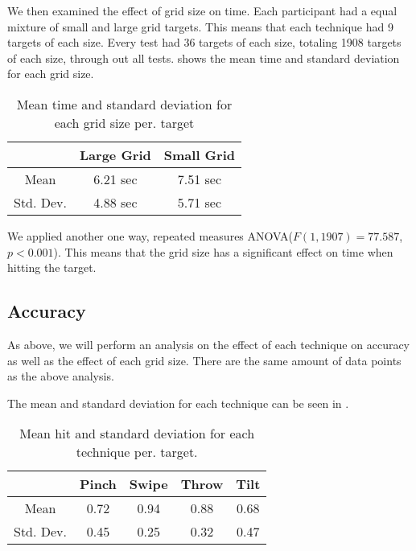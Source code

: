 We then examined the effect of grid size on time. Each participant had a equal mixture of small and large grid targets. This means that each technique had 9 targets of each size. Every test had 36 targets of each size, totaling 1908 targets of each size, through out all tests.  shows the mean time and standard deviation for each grid size. 

\begin{table}[H]
	\centering
	\begin{tabular}{|c|c|c|}
		\hline
		\rowcolor[HTML]{9B9B9B} 
		 & \textbf{Large Grid} & \textbf{Small Grid} \\ \hline
		Mean & 6.21 sec & 7.51 sec \\ \hline
		Std. Dev. & 4.88 sec & 5.71 sec \\ \hline
	\end{tabular}
	\caption{Mean time and standard deviation for each grid size per. target}
	\label{tab:meanTimesSize}
\end{table}

We applied another one way, repeated measures ANOVA($F(1,1907) = 77.587$, $p<0.001$). This means that the grid size has a significant effect on time when hitting the target. 

\subsection{Accuracy}

As above, we will perform an analysis on the effect of each technique on accuracy as well as the effect of each grid size. There are the same amount of data points as the above analysis. 

The mean and standard deviation for each technique can be seen in . 

\begin{table}[H]
	\centering
	\begin{tabular}{|c|c|c|c|c|}
			\hline
			\rowcolor[HTML]{9B9B9B} 
			& \textbf{Pinch} & \textbf{Swipe} & \textbf{Throw} & \textbf{Tilt} \\ \hline
			Mean & 0.72         & 0.94          & 0.88          & 0.68         \\ \hline
			Std. Dev. & 0.45 & 0.25 & 0.32 & 0.47 \\ \hline
	\end{tabular}
	\caption{Mean hit  and standard deviation for each technique per. target.}
	\label{tab:meanHitTechnique}
\end{table}


